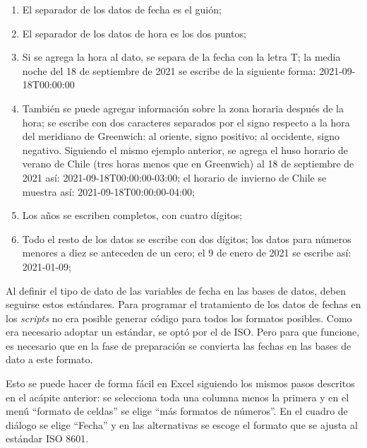 \documentclass[
  spanish,
]{book}
\begin{document}
\begin{enumerate}
\def\labelenumi{\arabic{enumi}.}
\item
  El separador de los datos de fecha es el guión;
\item
  El separador de los datos de hora es los dos puntos;
\item
  Si se agrega la hora al dato, se separa de la fecha con la letra T; la media noche del 18 de septiembre de 2021 se escribe de la siguiente forma: 2021-09-18T00:00:00
\item
  También se puede agregar información sobre la zona horaria después de la hora; se escribe con dos caracteres separados por el signo respecto a la hora del meridiano de Greenwich: al oriente, signo positivo; al occidente, signo negativo. Siguiendo el mismo ejemplo anterior, se agrega el huso horario de verano de Chile (tres horas menos que en Greenwich) al 18 de septiembre de 2021 así: 2021-09-18T00:00:00-03:00; el horario de invierno de Chile se muestra así: 2021-09-18T00:00:00-04:00;
\item
  Los años se escriben completos, con cuatro dígitos;
\item
  Todo el resto de los datos se escribe con dos dígitos; los datos para números menores a diez se anteceden de un cero; el 9 de enero de 2021 se escribe así: 2021-01-09;
\end{enumerate}

Al definir el tipo de dato de las variables de fecha en las bases de datos, deben seguirse estos estándares. Para programar el tratamiento de los datos de fechas en los \emph{scripts} no era posible generar código para todos los formatos posibles. Como era necesario adoptar un estándar, se optó por el de ISO. Pero para que funcione, es necesario que en la fase de preparación se convierta las fechas en las bases de dato a este formato.

Esto se puede hacer de forma fácil en Excel siguiendo los mismos pasos descritos en el acápite anterior: se selecciona toda una columna menos la primera y en el menú ``formato de celdas'' se elige ``más formatos de números''. En el cuadro de diálogo se elige ``Fecha'' y en las alternativas se escoge el formato que se ajusta al estándar ISO 8601.
\end{document}
